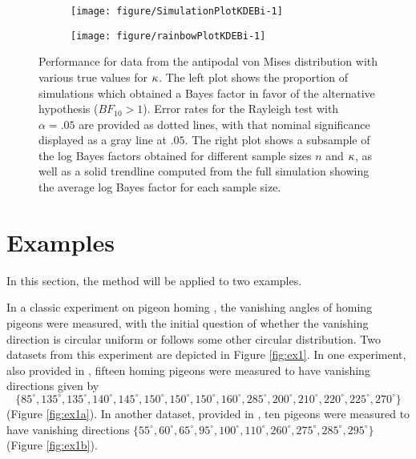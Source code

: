 \begin{figure}
  \begin{subfigure}[t]{0.5\linewidth}\centering
\begin{knitrout}
\color{fgcolor}
\texttt{[image: figure/SimulationPlotKDEBi-1]} 

\end{knitrout}
    \caption{}\label{fig:simKDEBierror}
  \end{subfigure}%
  \begin{subfigure}[t]{0.5\linewidth}\centering
\begin{knitrout}
\color{fgcolor}
\texttt{[image: figure/rainbowPlotKDEBi-1]} 

\end{knitrout}
    \caption{}\label{fig:simKDEBibfs}
  \end{subfigure}
  \caption{Performance for data from the antipodal von Mises distribution with various true values for \( \kappa \). The left plot shows the proportion of simulations which obtained a Bayes factor in favor of the alternative hypothesis (\(BF_{10} > 1\)). Error rates for the Rayleigh test with \(\alpha = .05\) are provided as dotted lines, with that nominal significance displayed as a gray line at \(.05\). The right plot shows a subsample of the log Bayes factors obtained for different sample sizes \(n\) and \(\kappa\), as well as a solid trendline computed from the full simulation showing the average log Bayes factor for each sample size.}\label{fig:simKDEBi}
\end{figure}



\section{Examples} \label{sec:ex}
In this section, the method will be applied to two examples. 




In a classic experiment on pigeon homing \citep{schmidt1963role}, the vanishing angles of homing pigeons were measured, with the initial question of whether the vanishing direction is circular uniform or follows some other circular distribution. Two datasets from this experiment are depicted in Figure \ref{fig:ex1}. In one experiment, also provided in \citet{fisher1995statistical}, fifteen homing pigeons were measured to have vanishing directions given by \[ \{ 85^\circ, 135^\circ, 135^\circ, 140^\circ, 145^\circ, 150^\circ, 150^\circ, 150^\circ, 160^\circ, 285^\circ, 200^\circ, 210^\circ, 220^\circ, 225^\circ, 270^\circ \} \] (Figure \ref{fig:ex1a}). In another dataset, provided in \citet{mardia2009directional}, ten pigeons were measured to have vanishing directions \(\{ 55^\circ, 60^\circ, 65^\circ, 95^\circ, 100^\circ, 110^\circ, 260^\circ, 275^\circ, 285^\circ, 295^\circ\}\) (Figure \ref{fig:ex1b}).

